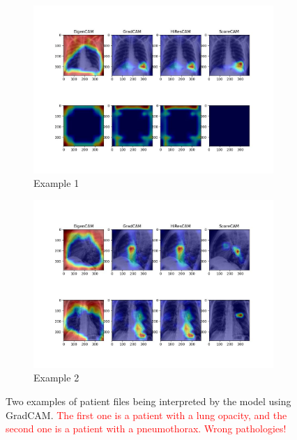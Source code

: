 \documentclass[11pt]{article}
\newcommand\myworries[1]{\textcolor{red}{#1}}
\begin{document}
        \begin{figure}[H]
                 \centering
                 \begin{subfigure}[b]{0.45\textwidth}
                     \centering
                     \includegraphics[width=\textwidth]{plots/heatmaps_3}
                     \caption{Example 1}
                     \vspace{4ex}
                     \label{fig:gradcam3}
                 \end{subfigure}
                 \hfill
                 \begin{subfigure}[b]{0.45\textwidth}
                     \centering
                     \includegraphics[width=\textwidth]{plots/heatmaps_6}
                     \caption{Example 2}
                     \vspace{4ex}
                     \label{fig:gradcam4}
                 \end{subfigure}
                 \label{fig:gradcam_example_chexpert}
                 \caption{Two examples of patient files being interpreted by the model using GradCAM. \myworries{The first one is a patient with a lung opacity, and the second one is a patient with a pneumothorax. Wrong pathologies!}}

            \end{figure}
\end{document}
